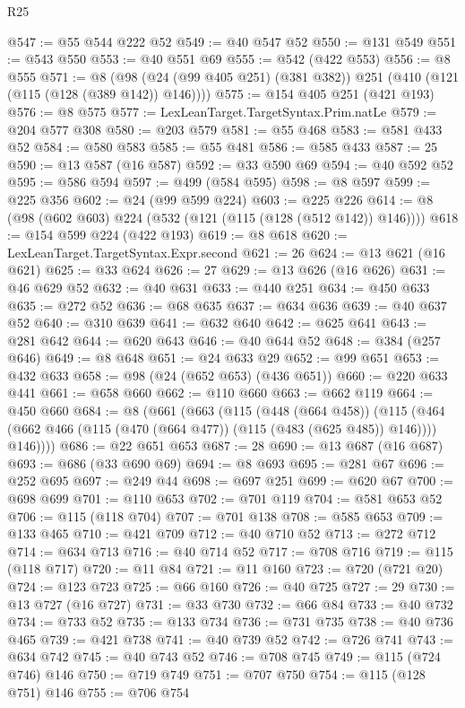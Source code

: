 \begin{lexlean}{R25}
\begin{coremodule}
@547 := @55 @544 @222 @52
@549 := @40 @547 @52
@550 := @131 @549
@551 := @543 @550
@553 := @40 @551 @69
@555 := @542 (@422 @553)
@556 := @8 @555
@571 := @8 (@98 (@24 (@99 @405 @251) (@381 @382)) @251 (@410 (@121 (@115 (@128 (@389 @142)) @146))))
@575 := @154 @405 @251 (@421 @193)
@576 := @8 @575
@577 := LexLeanTarget.TargetSyntax.Prim.natLe
@579 := @204 @577 @308
@580 := @203 @579
@581 := @55 @468
@583 := @581 @433 @52
@584 := @580 @583
@585 := @55 @481
@586 := @585 @433
@587 := 25
@590 := @13 @587 (@16 @587)
@592 := @33 @590 @69
@594 := @40 @592 @52
@595 := @586 @594
@597 := @499 (@584 @595)
@598 := @8 @597
@599 := @225 @356
@602 := @24 (@99 @599 @224)
@603 := @225 @226
@614 := @8 (@98 (@602 @603) @224 (@532 (@121 (@115 (@128 (@512 @142)) @146))))
@618 := @154 @599 @224 (@422 @193)
@619 := @8 @618
@620 := LexLeanTarget.TargetSyntax.Expr.second
@621 := 26
@624 := @13 @621 (@16 @621)
@625 := @33 @624
@626 := 27
@629 := @13 @626 (@16 @626)
@631 := @46 @629 @52
@632 := @40 @631
@633 := @440 @251
@634 := @450 @633
@635 := @272 @52
@636 := @68 @635
@637 := @634 @636
@639 := @40 @637 @52
@640 := @310 @639
@641 := @632 @640
@642 := @625 @641
@643 := @281 @642
@644 := @620 @643
@646 := @40 @644 @52
@648 := @384 (@257 @646)
@649 := @8 @648
@651 := @24 @633 @29
@652 := @99 @651
@653 := @432 @633
@658 := @98 (@24 (@652 @653) (@436 @651))
@660 := @220 @633 @441
@661 := @658 @660
@662 := @110 @660
@663 := @662 @119
@664 := @450 @660
@684 := @8
    (@661
      (@663
        (@115
          (@448 (@664 @458))
          (@115 (@464 (@662 @466 (@115 (@470 (@664 @477)) (@115 (@483 (@625 @485)) @146)))) @146))))
@686 := @22 @651 @653
@687 := 28
@690 := @13 @687 (@16 @687)
@693 := @686 (@33 @690 @69)
@694 := @8 @693
@695 := @281 @67
@696 := @252 @695
@697 := @249 @44
@698 := @697 @251
@699 := @620 @67
@700 := @698 @699
@701 := @110 @653
@702 := @701 @119
@704 := @581 @653 @52
@706 := @115 (@118 @704)
@707 := @701 @138
@708 := @585 @653
@709 := @133 @465
@710 := @421 @709
@712 := @40 @710 @52
@713 := @272 @712
@714 := @634 @713
@716 := @40 @714 @52
@717 := @708 @716
@719 := @115 (@118 @717)
@720 := @11 @84
@721 := @11 @160
@723 := @720 (@721 @20)
@724 := @123 @723
@725 := @66 @160
@726 := @40 @725
@727 := 29
@730 := @13 @727 (@16 @727)
@731 := @33 @730
@732 := @66 @84
@733 := @40 @732
@734 := @733 @52
@735 := @133 @734
@736 := @731 @735
@738 := @40 @736 @465
@739 := @421 @738
@741 := @40 @739 @52
@742 := @726 @741
@743 := @634 @742
@745 := @40 @743 @52
@746 := @708 @745
@749 := @115 (@724 @746) @146
@750 := @719 @749
@751 := @707 @750
@754 := @115 (@128 @751) @146
@755 := @706 @754

\end{coremodule}
\end{lexlean}
